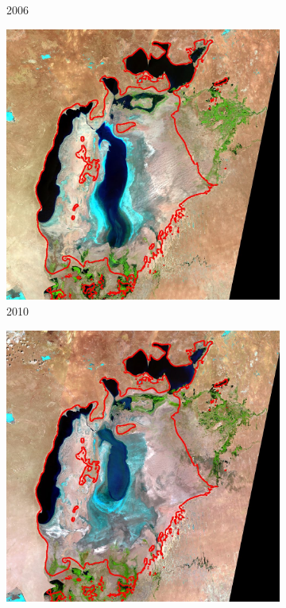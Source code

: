 \documentclass[12pt,a4paper]{article}
\begin{document}
\begin{figure}
\begin{subfigure}[b]{0.19\textwidth}
        \caption{2006}
    \end{subfigure}
    \begin{subfigure}[b]{0.19\textwidth}
        \centering
        \includegraphics[width=\textwidth]{../img/2010o.jpg}
        \caption{2010}
    \end{subfigure}
    \begin{subfigure}[b]{0.19\textwidth}
        \centering
        \includegraphics[width=\textwidth]{../img/2013o.jpg}

\end{subfigure}
\end{figure}
\end{document}
